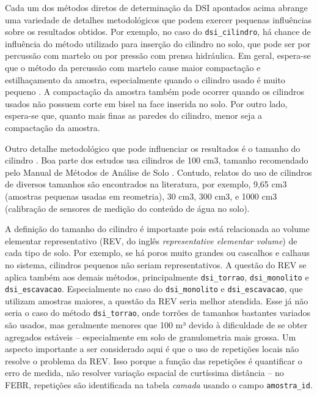 \documentclass[
]{book}
\begin{document}
Cada um dos métodos diretos de determinação da DSI apontados acima abrange uma variedade de detalhes metodológicos que podem exercer pequenas influências sobre os resultados obtidos. Por exemplo, no caso do \texttt{dsi\_cilindro}, há chance de influência do método utilizado para inserção do cilindro no solo, que pode ser por percussão com martelo ou por pressão com prensa hidráulica. Em geral, espera-se que o método da percussão com martelo cause maior compactação e estilhaçamento da amostra, especialmente quando o cilindro usado é muito pequeno \citep{CasanovaEtAl2016}. A compactação da amostra também pode ocorrer quando os cilindros usados não possuem corte em bisel na face inserida no solo. Por outro lado, espera-se que, quanto mais finas as paredes do cilindro, menor seja a compactação da amostra.

Outro detalhe metodológico que pode influenciar os resultados é o tamanho do cilindro \citep{Al-ShammaryEtAl2018, CasanovaEtAl2016}. Boa parte dos estudos usa cilindros de 100 cm3, tamanho recomendado pelo Manual de Métodos de Análise de Solo \citep{AlmeidaEtAl2017}. Contudo, relatos do uso de cilindros de diversos tamanhos são encontrados na literatura, por exemplo, 9,65 cm3 (amostras pequenas usadas em reometria), 30 cm3, 300 cm3, e 1000 cm3 (calibração de sensores de medição do conteúdo de água no solo).

A definição do tamanho do cilindro é importante pois está relacionada ao volume elementar representativo (REV, do inglês \emph{representative elementar volume}) de cada tipo de solo. Por exemplo, se há poros muito grandes ou cascalhos e calhaus no sistema, cilindros pequenos não seriam representativos. A questão do REV se aplica também aos demais métodos, principalmente \texttt{dsi\_torrao}, \texttt{dsi\_monolito} e \texttt{dsi\_escavacao}. Especialmente no caso do \texttt{dsi\_monolito} e \texttt{dsi\_escavacao}, que utilizam amostras maiores, a questão da REV seria melhor atendida. Esse já não seria o caso do método \texttt{dsi\_torrao}, onde torrões de tamanhos bastantes variados são usados, mas geralmente menores que 100 m³ devido à dificuldade de se obter agregados estáveis -- especialmente em solo de granulometria mais grossa. Um aspecto importante a ser considerado aqui é que o uso de repetições locais não resolve o problema da REV. Isso porque a função das repetições é quantificar o erro de medida, não resolver variação espacial de curtíssima distância -- no FEBR, repetições são identificada na tabela \emph{camada} usando o campo \texttt{amostra\_id}.
\end{document}
